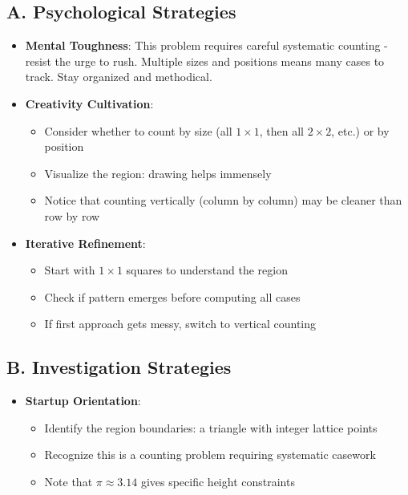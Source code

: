 \documentclass[12pt]{article}
\begin{document}
\begin{strategicbox}
\subsection*{A. Psychological Strategies}
\begin{itemize}[leftmargin=*]
    \item \textbf{Mental Toughness}: This problem requires careful systematic counting - resist the urge to rush. Multiple sizes and positions means many cases to track. Stay organized and methodical.
    
    \item \textbf{Creativity Cultivation}: 
    \begin{itemize}
        \item Consider whether to count by size (all $1 \times 1$, then all $2 \times 2$, etc.) or by position
        \item Visualize the region: drawing helps immensely
        \item Notice that counting vertically (column by column) may be cleaner than row by row
    \end{itemize}
    
    \item \textbf{Iterative Refinement}: 
    \begin{itemize}
        \item Start with $1 \times 1$ squares to understand the region
        \item Check if pattern emerges before computing all cases
        \item If first approach gets messy, switch to vertical counting
    \end{itemize}
\end{itemize}

\subsection*{B. Investigation Strategies}
\begin{itemize}[leftmargin=*]
    \item \textbf{Startup Orientation}: 
    \begin{itemize}
        \item Identify the region boundaries: a triangle with integer lattice points
        \item Recognize this is a counting problem requiring systematic casework
        \item Note that $\pi \approx 3.14$ gives specific height constraints
    \end{itemize}
    

\end{itemize}
\end{strategicbox}
\end{document}
